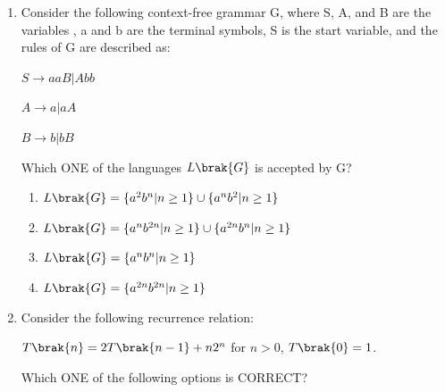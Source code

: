 \documentclass[a4paper, 11pt]{article}
\begin{document}
\begin{enumerate}
    \begin{enumerate}
    \end{enumerate}
    \hfill{}
    \item Consider the following context-free grammar G, where S, A, and B are the variables , a and b are the terminal symbols, S is the start variable, and the rules of G are described as:
    \begin{center} 
    $S \rightarrow aaB | Abb$
    
    $A \rightarrow a | aA$
    
    $B \rightarrow b | bB$
    \end{center}
    Which ONE of the languages $L\brak{G}$ is accepted by G?
    \begin{enumerate}
        \item $L\brak{G} = \{a^2 b^n | n \ge 1\} \cup \{a^n b^2 | n \ge 1\}$
        \item $L\brak{G} = \{a^n b^{2n} | n \ge 1\} \cup \{a^{2n} b^n | n \ge 1\}$
        \item $L\brak{G} = \{a^n b^n | n \ge 1\}$
        \item $L\brak{G} = \{a^{2n} b^{2n} | n \ge 1\}$
    \end{enumerate}
    \hfill{}
    \item Consider the following recurrence relation:
    \begin{center}
    $T\brak{n} = 2T\brak{n-1} + n2^n$ for $n>0$, $T\brak{0}=1$.
    \end{center}
    Which ONE of the following options is CORRECT?
    \begin{enumerate}
    \end{enumerate}


\end{enumerate}
\end{document}
